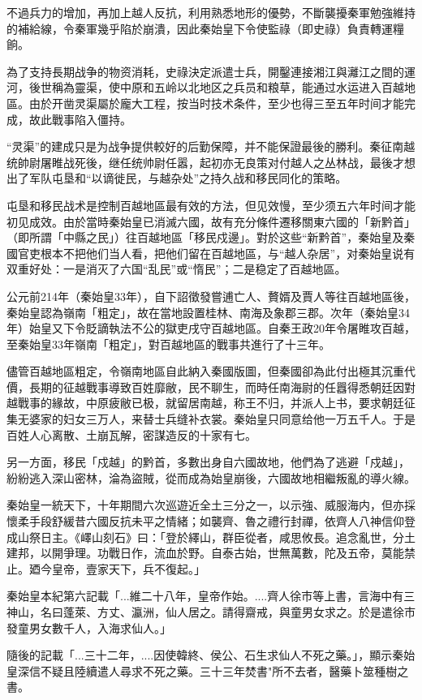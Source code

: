 不過兵力的增加，再加上越人反抗，利用熟悉地形的優勢，不斷襲擾秦軍勉強維持的補給線，令秦軍幾乎陷於崩潰，因此秦始皇下令使監祿（即史祿）負責轉運糧餉。

為了支持長期战争的物资消耗，史祿決定派遣士兵，開鑿連接湘江與灕江之間的運河，後世稱為靈渠，使中原和五岭以北地区之兵员和粮草，能通过水运进入百越地區。由於开凿灵渠屬於龐大工程，按当时技术条件，至少也得三至五年时间才能完成，故此戰事陷入僵持。

“灵渠”的建成只是为战争提供較好的后勤保障，并不能保證最後的勝利。秦征南越统帥尉屠睢战死後，继任统帅尉任嚣，起初亦无良策对付越人之丛林战，最後才想出了军队屯垦和“以谪徙民，与越杂处”之持久战和移民同化的策略。

屯垦和移民战术是控制百越地區最有效的方法，但见效慢，至少须五六年时间才能初见成效。由於當時秦始皇已消滅六國，故有充分條件遷移關東六國的「新黔首」（即所謂「中縣之民」）往百越地區「移民戍邊」。對於这些“新黔首”，秦始皇及秦國官吏根本不把他们当人看，把他们留在百越地區，与“越人杂居”，对秦始皇说有双重好处：一是消灭了六国“乱民”或“惰民”；二是稳定了百越地區。

公元前214年（秦始皇33年），自下詔徵發嘗逋亡人、贅婿及賈人等往百越地區後，秦始皇認為嶺南「粗定」，故在當地設置桂林、南海及象郡三郡。次年（秦始皇34年）始皇又下令貶謫執法不公的獄吏戌守百越地區。自秦王政20年令屠睢攻百越，至秦始皇33年嶺南「粗定」，對百越地區的戰事共進行了十三年。

儘管百越地區粗定，令嶺南地區自此納入秦國版圖，但秦國卻為此付出極其沉重代價，長期的征越戰事導致百姓靡敝，民不聊生，而時任南海尉的任囂得悉朝廷因對越戰事的緣故，中原疲敝已极，就留居南越，称王不归，并派人上书，要求朝廷征集无婆家的妇女三万人，来替士兵缝补衣裳。秦始皇只同意给他一万五千人。于是百姓人心离散、土崩瓦解，密謀造反的十家有七。

另一方面，移民「戍越」的黔首，多數出身自六國故地，他們為了逃避「戍越」，紛紛逃入深山密林，淪為盜賊，從而成為始皇崩後，六國故地相繼叛亂的導火線。

秦始皇一統天下，十年期間六次巡遊近全土三分之一，以示強、威服海内，但亦採懷柔手段舒緩昔六國反抗未平之情緒；如襲齊、魯之禮行封禪，依齊人八神信仰登成山祭日主。《嶧山刻石》曰：「登於繹山，群臣從者，咸思攸長。追念亂世，分土建邦，以開爭理。功戰日作，流血於野。自泰古始，世無萬數，陀及五帝，莫能禁止。廼今皇帝，壹家天下，兵不復起。」

秦始皇本紀第六記載「...維二十八年，皇帝作始。....齊人徐市等上書，言海中有三神山，名曰蓬萊、方丈、瀛洲，仙人居之。請得齋戒，與童男女求之。於是遣徐市發童男女數千人，入海求仙人。」

隨後的記載「...三十二年，....因使韓終、侯公、石生求仙人不死之藥。」，顯示秦始皇深信不疑且陸續遣人尋求不死之藥。三十三年焚書"所不去者，醫藥卜筮種樹之書。

